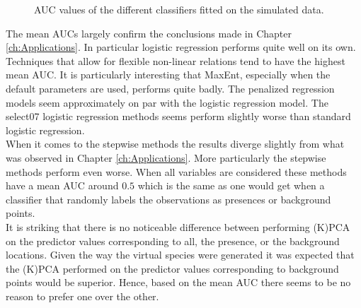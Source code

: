 \begin{figure}[!htb]
\center
{}
\caption{\label{fig:AUCSimulation}AUC values of the different classifiers fitted on the simulated data.}
\end{figure}




The mean AUCs largely confirm the conclusions made in Chapter \ref{ch:Applications}. In particular logistic regression performs quite well on its own. Techniques that allow for flexible non-linear relations tend to have the highest mean AUC. It is particularly interesting that MaxEnt, especially when the default parameters are used, performs quite badly. The penalized regression models seem approximately on par with the logistic regression model. The select07 logistic regression methods seems perform slightly worse than standard logistic regression. \\ 

When it comes to the stepwise methods the results diverge slightly from what was observed in Chapter \ref{ch:Applications}. More particularly the stepwise methods perform even worse. When all variables are considered these methods have a mean AUC around $0.5$ which is the same as one would get when a classifier that randomly labels the observations as presences or background points. \\

It is striking that there is no noticeable difference between performing (K)PCA on the predictor values corresponding to all, the presence, or the background locations. Given the way the virtual species were generated it was expected that the (K)PCA performed on the predictor values corresponding to background points would be superior. Hence, based on the mean AUC there seems to be no reason to prefer one over the other. \\

